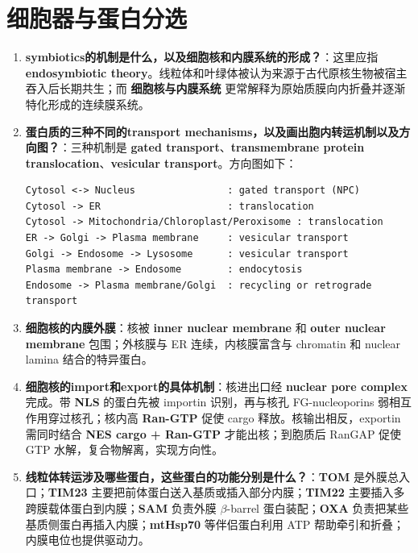 \documentclass[12pt,fontset=none]{ctexart}
\begin{document}
\section*{细胞器与蛋白分选}
\begin{enumerate}
\item \textbf{symbiotics的机制是什么，以及细胞核和内膜系统的形成？}：这里应指 \textbf{endosymbiotic theory}。线粒体和叶绿体被认为来源于古代原核生物被宿主吞入后长期共生；而 \textbf{细胞核与内膜系统} 更常解释为原始质膜向内折叠并逐渐特化形成的连续膜系统。

\item \textbf{蛋白质的三种不同的transport mechanisms，以及画出胞内转运机制以及方向图？}：三种机制是 \textbf{gated transport}、\textbf{transmembrane protein translocation}、\textbf{vesicular transport}。方向图如下：

\begin{verbatim}
Cytosol <-> Nucleus                : gated transport (NPC)
Cytosol -> ER                      : translocation
Cytosol -> Mitochondria/Chloroplast/Peroxisome : translocation
ER -> Golgi -> Plasma membrane     : vesicular transport
Golgi -> Endosome -> Lysosome      : vesicular transport
Plasma membrane -> Endosome        : endocytosis
Endosome -> Plasma membrane/Golgi  : recycling or retrograde transport
\end{verbatim}

\item \textbf{细胞核的内膜外膜}：核被 \textbf{inner nuclear membrane} 和 \textbf{outer nuclear membrane} 包围；外核膜与 ER 连续，内核膜富含与 chromatin 和 nuclear lamina 结合的特异蛋白。

\item \textbf{细胞核的import和export的具体机制}：核进出口经 \textbf{nuclear pore complex} 完成。带 \textbf{NLS} 的蛋白先被 importin 识别，再与核孔 FG-nucleoporins 弱相互作用穿过核孔；核内高 \textbf{Ran-GTP} 促使 cargo 释放。核输出相反，exportin 需同时结合 \textbf{NES cargo + Ran-GTP} 才能出核；到胞质后 RanGAP 促使 GTP 水解，复合物解离，实现方向性。

\item \textbf{线粒体转运涉及哪些蛋白，这些蛋白的功能分别是什么？}：\textbf{TOM} 是外膜总入口；\textbf{TIM23} 主要把前体蛋白送入基质或插入部分内膜；\textbf{TIM22} 主要插入多跨膜载体蛋白到内膜；\textbf{SAM} 负责外膜 $\beta$-barrel 蛋白装配；\textbf{OXA} 负责把某些基质侧蛋白再插入内膜；\textbf{mtHsp70} 等伴侣蛋白利用 ATP 帮助牵引和折叠；内膜电位也提供驱动力。


\end{enumerate}
\end{document}
